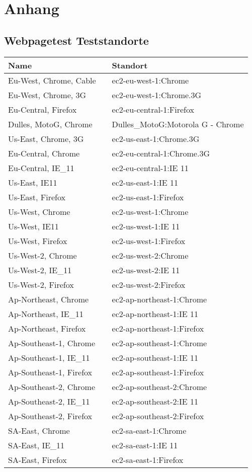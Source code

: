 \section{Anhang} %
\label{sec:anhang}

	\subsection{Webpagetest Teststandorte} %
	\label{sub:webpagetest_teststandorte}

		\begin{tabular}[pht]{lll}
		  Name && Standort \\ \hline
			Eu-West, Chrome, Cable && ec2-eu-west-1:Chrome \\[8pt]
			Eu-West, Chrome, 3G	&& ec2-eu-west-1:Chrome.3G \\[8pt]
			Eu-Central, Firefox	&& ec2-eu-central-1:Firefox \\[8pt]
			Dulles, MotoG, Chrome &&	Dulles\_MotoG:Motorola G - Chrome \\[8pt]
			Us-East, Chrome, 3G	&& ec2-us-east-1:Chrome.3G \\[8pt]
			Eu-Central, Chrome	&& ec2-eu-central-1:Chrome.3G \\[8pt]
			Eu-Central, IE\_11	&& ec2-eu-central-1:IE 11 \\[8pt]
			Us-East, IE11	&& ec2-us-east-1:IE 11 \\[8pt]
			Us-East, Firefox	&& ec2-us-east-1:Firefox \\[8pt]
			Us-West, Chrome	&& ec2-us-west-1:Chrome \\[8pt]
			Us-West, IE11	&& ec2-us-west-1:IE 11 \\[8pt]
			Us-West, Firefox	&& ec2-us-west-1:Firefox \\[8pt]
			Us-West-2, Chrome	&& ec2-us-west-2:Chrome \\[8pt]
			Us-West-2, IE\_11	&& ec2-us-west-2:IE 11 \\[8pt]
			Us-West-2, Firefox	&& ec2-us-west-2:Firefox \\[8pt]
			Ap-Northeast, Chrome	&& ec2-ap-northeast-1:Chrome \\[8pt]
			Ap-Northeast, IE\_11	&& ec2-ap-northeast-1:IE 11 \\[8pt]
			Ap-Northeast, Firefox	&& ec2-ap-northeast-1:Firefox \\[8pt]
			Ap-Southeast-1, Chrome	&& ec2-ap-southeast-1:Chrome \\[8pt]
			Ap-Southeast-1, IE\_11	&& ec2-ap-southeast-1:IE 11 \\[8pt]
			Ap-Southeast-1, Firefox	&& ec2-ap-southeast-1:Firefox \\[8pt]
			Ap-Southeast-2, Chrome	&& ec2-ap-southeast-2:Chrome \\[8pt]
			Ap-Southeast-2, IE\_11	&& ec2-ap-southeast-2:IE 11 \\[8pt]
			Ap-Southeast-2, Firefox	&& ec2-ap-southeast-2:Firefox \\[8pt]
			SA-East, Chrome	&& ec2-sa-east-1:Chrome \\[8pt]
			SA-East, IE\_11	&& ec2-sa-east-1:IE 11 \\[8pt]
			SA-East, Firefox	&& ec2-sa-east-1:Firefox \\[8pt]
		\end{tabular}
